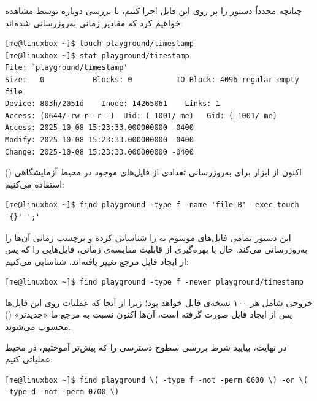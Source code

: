 چنانچه مجدداً دستور  را بر روی این فایل اجرا کنیم، با بررسی دوباره توسط  مشاهده خواهیم کرد که مقادیر زمانی به‌روزرسانی شده‌اند:

\begin{latin}
\begin{lstlisting}
[me@linuxbox ~]$ touch playground/timestamp
[me@linuxbox ~]$ stat playground/timestamp
File: `playground/timestamp'
Size:   0           Blocks: 0          IO Block: 4096 regular empty file
Device: 803h/2051d    Inode: 14265061    Links: 1
Access: (0644/-rw-r--r--)  Uid: ( 1001/ me)   Gid: ( 1001/ me)
Access: 2025-10-08 15:23:33.000000000 -0400
Modify: 2025-10-08 15:23:33.000000000 -0400
Change: 2025-10-08 15:23:33.000000000 -0400
\end{lstlisting}
\end{latin}

اکنون از ابزار  برای به‌روزرسانی تعدادی از فایل‌های موجود در محیط آزمایشگاهی () استفاده می‌کنیم:

\begin{latin}
\begin{lstlisting}
[me@linuxbox ~]$ find playground -type f -name 'file-B' -exec touch '{}' ';'
\end{lstlisting}
\end{latin}

این دستور تمامی فایل‌های موسوم به  را شناسایی کرده و برچسب زمانی آن‌ها را به‌روزرسانی می‌کند. حال با بهره‌گیری از قابلیت مقایسه‌ی زمانی، فایل‌هایی را که پس از ایجاد فایل مرجع  تغییر یافته‌اند، شناسایی می‌کنیم:

\begin{latin}
\begin{lstlisting}
[me@linuxbox ~]$ find playground -type f -newer playground/timestamp
\end{lstlisting}
\end{latin}

خروجی شامل هر ۱۰۰ نسخه‌ی فایل  خواهد بود؛ زیرا از آنجا که عملیات  روی این فایل‌ها پس از ایجاد فایل  صورت گرفته است، آن‌ها اکنون نسبت به مرجع ما «جدیدتر» () محسوب می‌شوند.

در نهایت، بیایید شرط بررسی سطوح دسترسی را که پیش‌تر آموختیم، در محیط  عملیاتی کنیم:

\begin{latin}
\begin{lstlisting}
[me@linuxbox ~]$ find playground \( -type f -not -perm 0600 \) -or \( -type d -not -perm 0700 \)
\end{lstlisting}
\end{latin}

